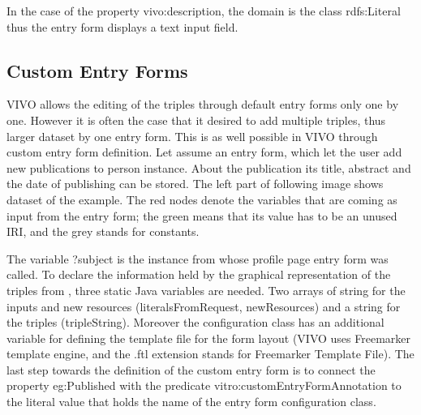 In the case of the property vivo:description, the domain is the class rdfs:Literal thus the entry form displays a text input field.



\subsection{Custom Entry Forms} \label{vivoCef}

VIVO allows the editing of the triples through default entry forms only one by one. However it is often the case that it desired to add multiple triples, thus larger dataset by one entry form. This is as well possible in VIVO through custom entry form definition.
Let assume an entry form, which let the user add new publications to person instance. About the publication its title, abstract and the date of publishing can be stored. The left part of following image shows dataset of the example. The red nodes denote the variables that are coming as input from the entry form; the green means that its value has to be an unused IRI, and the grey stands for constants. 


The variable ?subject is the instance from whose profile page entry form was called.  To declare the information held by the graphical representation of the triples from , three static Java variables are needed. Two arrays of string for the inputs and new resources (literalsFromRequest, newResources) and a string for the triples (tripleString).  Moreover the configuration class has an additional variable for defining the template file for the form layout (VIVO uses Freemarker template engine, and the .ftl extension stands for Freemarker Template File). 
The last step towards the definition of the custom entry form is to connect the property eg:Published with the predicate vitro:customEntryFormAnnotation to the literal value that holds the name of the entry form configuration class.



